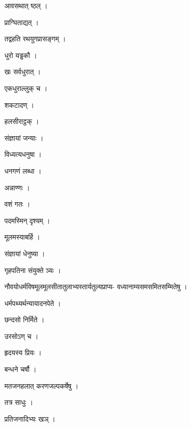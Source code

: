 \documentclass[10pt, openany, oneside]{book}
\begin{document}
\noindent आवसथात् ष्ठल् ।

\noindent प्राग्घिताद्यत् ।

\noindent तद्वहति रथयुगप्रासङ्गम् ।

\noindent धुरो यड्ढकौ ।

\noindent खः सर्वधुरात् ।

\noindent एकधुराल्लुक् च ।

\noindent शकटादण् ।

\noindent हलसीराट्ठक् ।

\noindent संज्ञायां जन्याः ।

\noindent विध्यत्यधनुषा ।

\noindent धनगणं लब्धा ।

\noindent अन्नाण्णः ।

\noindent वशं गतः ।

\noindent पदमस्मिन् दृश्यम् ।

\noindent मूलमस्याबर्हि ।

\noindent संज्ञायां धेनुष्या ।

\noindent गृहपतिना संयुक्ते ञ्यः ।

\noindent नौवयोधर्मविषमूलमूलसीतातुलाभ्यस्तार्यतुल्यप्राप्य- वध्यानाम्यसमसमितसम्मितेषु ।

\noindent धर्मपथ्यर्थन्यायादनपेते ।

\noindent छन्दसो निर्मिते ।

\noindent उरसोऽण् च ।

\noindent हृदयस्य प्रियः ।

\noindent बन्धने चर्षौ ।

\noindent मतजनहलात् करणजल्पकर्षेषु ।

\noindent तत्र साधुः ।

\noindent प्रतिजनादिभ्यः खञ् ।
\end{document}
